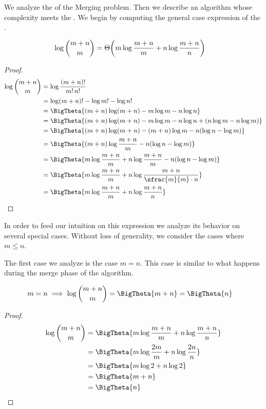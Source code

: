 We analyze the \ITLB of the Merging problem. Then we
describe an algorithm whose complexity meets the \ITLB. We begin by
computing the general case expression of the \ITLB.
\begin{lemma}
\begin{align*}
\log\binom{m+n}{m} &= \Theta\mleft(m \log\frac{m+n}{m} + n \log\frac{m+n}{n}\mright)
\end{align*}
\end{lemma}
\begin{proof}
\begin{align*}
\log\binom{m+n}{m} &= \log\frac{(m+n)!}{m! \, n!}\\
&= \log(m+n)! - \log m! - \log n!\\
&= \BigTheta{(m+n) \log(m+n) - m \log m - n \log n}\\
&= \BigTheta{(m+n) \log(m+n) - m \log m - n \log n + (n \log m - n \log m)}\\
&= \BigTheta{(m+n) \log(m+n) - (m+n) \log m - n (\log n - \log m)}\\
&= \BigTheta{(m+n) \log\frac{m+n}{m} - n (\log n - \log m)}\\
&= \BigTheta{m \log\frac{m+n}{m} + n \log\frac{m+n}{m} - n (\log n - \log m)}\\
&= \BigTheta{m \log\frac{m+n}{m} + n \log\frac{m+n}{\sfrac{m}{m} \cdot n}}\\
&= \BigTheta{m \log\frac{m+n}{m} + n \log\frac{m+n}{n}}\qedhere
\end{align*}
\end{proof}

In order to feed our intuition on this expression we analyze its behavior
on several special cases. Without loss of generality, we consider the cases
where \(m \leq n\).

The first case we analyze is the case $m = n$. This case is similar
to what happens during the merge phase of the \mergesort algorithm.
\begin{lemma}
\begin{align*}
m = n &\implies \log\binom{m+n}{m} = \BigTheta{m + n} = \BigTheta{n}
\end{align*}
\end{lemma}
\begin{proof}
\begin{align*}
\log\binom{m+n}{m} &= \BigTheta{m \log\frac{m+n}{m} + n \log\frac{m+n}{n}}\\
&= \BigTheta{m \log\frac{2m}{m} + n \log\frac{2n}{n}}\\
&= \BigTheta{m \log 2 + n \log 2}\\
&= \BigTheta{m + n}\\
&= \BigTheta{n}\qedhere
\end{align*}
\end{proof}


